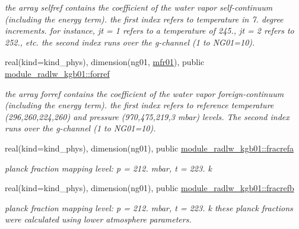 \begin{DoxyCompactItemize}
\begin{DoxyCompactList}\small\item\em the array selfref contains the coefficient of the water vapor self-\/continuum (including the energy term). the first index refers to temperature in 7. degree increments. for instance, jt = 1 refers to a temperature of 245., jt = 2 refers to 252., etc. the second index runs over the g-\/channel (1 to N\+G01=10). \end{DoxyCompactList}\item 
\mbox{\label{group__module__radlw__kgbnn_gacd70a32f88808dc40c39edee5b76adbe}} 
real(kind=kind\+\_\+phys), dimension(ng01, \hyperlink{group__module__radlw__kgbnn_ga4bd2e710d96291436f9ee36e99816a19}{mfr01}), public \hyperlink{group__module__radlw__kgbnn_gacd70a32f88808dc40c39edee5b76adbe}{module\+\_\+radlw\+\_\+kgb01\+::forref}
\begin{DoxyCompactList}\small\item\em the array forref contains the coefficient of the water vapor foreign-\/continuum (including the energy term). the first index refers to reference temperature (296,260,224,260) and pressure (970,475,219,3 mbar) levels. The second index runs over the g-\/channel (1 to N\+G01=10). \end{DoxyCompactList}\item 
\mbox{\label{group__module__radlw__kgbnn_ga0bca660247ac37483cd55c6936056631}} 
real(kind=kind\+\_\+phys), dimension(ng01), public \hyperlink{group__module__radlw__kgbnn_ga0bca660247ac37483cd55c6936056631}{module\+\_\+radlw\+\_\+kgb01\+::fracrefa}
\begin{DoxyCompactList}\small\item\em planck fraction mapping level\+: p = 212. mbar, t = 223. k \end{DoxyCompactList}\item 
\mbox{\label{group__module__radlw__kgbnn_ga19b6a3893965817e82c77bee1de536cd}} 
real(kind=kind\+\_\+phys), dimension(ng01), public \hyperlink{group__module__radlw__kgbnn_ga19b6a3893965817e82c77bee1de536cd}{module\+\_\+radlw\+\_\+kgb01\+::fracrefb}
\begin{DoxyCompactList}\small\item\em planck fraction mapping level\+: p = 212. mbar, t = 223. k these planck fractions were calculated using lower atmosphere parameters. \end{DoxyCompactList}\item 

\end{DoxyCompactItemize}
